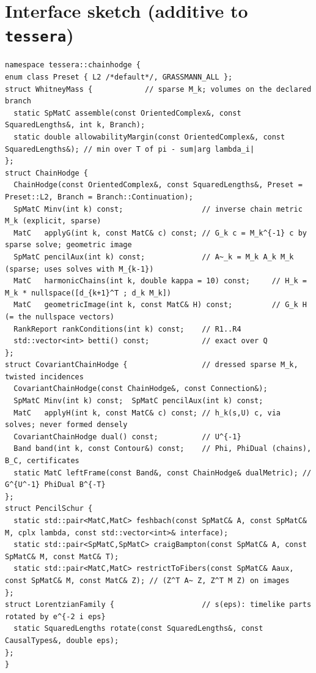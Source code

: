 \documentclass[11pt]{article}
\theoremstyle{definition}
\theoremstyle{plain}
\theoremstyle{remark}
\newcommand{\ttt}[1]{\texttt{#1}}
\begin{document}
\section{Interface sketch (additive to \ttt{tessera})}
\begin{lstlisting}
namespace tessera::chainhodge {
enum class Preset { L2 /*default*/, GRASSMANN_ALL };
struct WhitneyMass {            // sparse M_k; volumes on the declared branch
  static SpMatC assemble(const OrientedComplex&, const SquaredLengths&, int k, Branch);
  static double allowabilityMargin(const OrientedComplex&, const SquaredLengths&); // min over T of pi - sum|arg lambda_i|
};
struct ChainHodge {
  ChainHodge(const OrientedComplex&, const SquaredLengths&, Preset = Preset::L2, Branch = Branch::Continuation);
  SpMatC Minv(int k) const;                  // inverse chain metric M_k (explicit, sparse)
  MatC   applyG(int k, const MatC& c) const; // G_k c = M_k^{-1} c by sparse solve; geometric image
  SpMatC pencilAux(int k) const;             // A~_k = M_k A_k M_k (sparse; uses solves with M_{k-1})
  MatC   harmonicChains(int k, double kappa = 10) const;     // H_k = M_k * nullspace([d_{k+1}^T ; d_k M_k])
  MatC   geometricImage(int k, const MatC& H) const;         // G_k H (= the nullspace vectors)
  RankReport rankConditions(int k) const;    // R1..R4
  std::vector<int> betti() const;            // exact over Q
};
struct CovariantChainHodge {                 // dressed sparse M_k, twisted incidences
  CovariantChainHodge(const ChainHodge&, const Connection&);
  SpMatC Minv(int k) const;  SpMatC pencilAux(int k) const;
  MatC   applyH(int k, const MatC& c) const; // h_k(s,U) c, via solves; never formed densely
  CovariantChainHodge dual() const;          // U^{-1}
  Band band(int k, const Contour&) const;    // Phi, PhiDual (chains), B_C, certificates
  static MatC leftFrame(const Band&, const ChainHodge& dualMetric); // G^{U^-1} PhiDual B^{-T}
};
struct PencilSchur {
  static std::pair<MatC,MatC> feshbach(const SpMatC& A, const SpMatC& M, cplx lambda, const std::vector<int>& interface);
  static std::pair<SpMatC,SpMatC> craigBampton(const SpMatC& A, const SpMatC& M, const MatC& T);
  static std::pair<MatC,MatC> restrictToFibers(const SpMatC& Aaux, const SpMatC& M, const MatC& Z); // (Z^T A~ Z, Z^T M Z) on images
};
struct LorentzianFamily {                    // s(eps): timelike parts rotated by e^{-2 i eps}
  static SquaredLengths rotate(const SquaredLengths&, const CausalTypes&, double eps);
};
}
\end{lstlisting}
\end{document}
